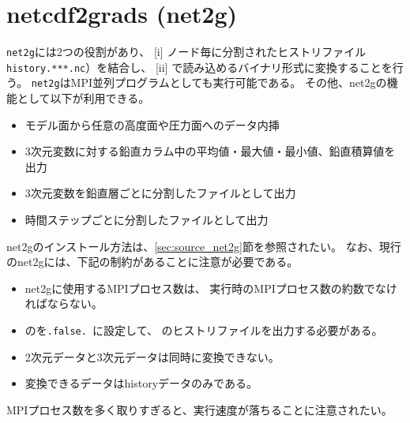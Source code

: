 \section{netcdf2grads (net2g)} \label{sec:net2g}

\verb|net2g|には2つの役割があり、
[i] ノード毎に分割されたヒストリファイル\verb|history.***.nc|）を結合し、
[ii] {\grads}で読み込めるバイナリ形式に変換することを行う。
\verb|net2g|はMPI並列プログラムとしても実行可能である。
その他、net2gの機能として以下が利用できる。
%
\begin{itemize}
 \item モデル面から任意の高度面や圧力面へのデータ内挿
 \item 3次元変数に対する鉛直カラム中の平均値・最大値・最小値、鉛直積算値を出力
 \item 3次元変数を鉛直層ごとに分割したファイルとして出力
 \item 時間ステップごとに分割したファイルとして出力
\end{itemize}

net2gのインストール方法は、\ref{sec:source_net2g}節を参照されたい。
なお、現行のnet2gには、下記の制約があることに注意が必要である。
\begin{itemize}
 \item net2gに使用するMPIプロセス数は、
\scalerm 実行時のMPIプロセス数の約数でなければならない。
\item {}のを\verb|.false. |に設定して、
\scalerm のヒストリファイルを出力する必要がある。
 \item 2次元データと3次元データは同時に変換できない。
 \item 変換できるデータはhistoryデータのみである。
\end{itemize}
MPIプロセス数を多く取りすぎると、実行速度が落ちることに注意されたい。

